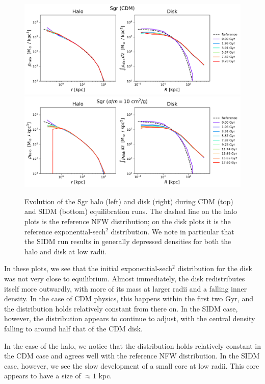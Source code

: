 \begin{figure}
    \centering
    \includegraphics[width=0.9\linewidth]{figs/sgr_evolution_cdm.pdf}
    \includegraphics[width=0.9\linewidth]{figs/sgr_evolution_sidm.pdf}
    \caption{%
        Evolution of the Sgr halo (left) and disk (right) during CDM (top) and
        SIDM (bottom) equilibration runs.  The dashed line on the halo plots
        is the reference NFW distribution; on the disk plots it is the
        reference exponential-sech$^2$ distribution.  We note in particular
        that the SIDM run results in generally depressed densities for both
        the halo and disk at low radii.
    }
    \label{fig:sgr_evo}
\end{figure}

In these plots, we see that the initial exponential-sech$^2$ distribution for
the disk was not very close to equilibrium. Almost immediately, the disk
redistributes itself more outwardly, with more of its mass at larger radii and a
falling inner density. In the case of CDM physics, this happens within the first
two Gyr, and the distribution holds relatively constant from there on. In the
SIDM case, however, the distribution appears to continue to adjust, with the
central density falling to around half that of the CDM disk.

In the case of the halo, we notice that the distribution holds relatively
constant in the CDM case and agrees well with the reference NFW distribution. In
the SIDM case, however, we see the slow development of a small core at low
radii. This core appears to have a size of $\approx 1$ kpc. 

